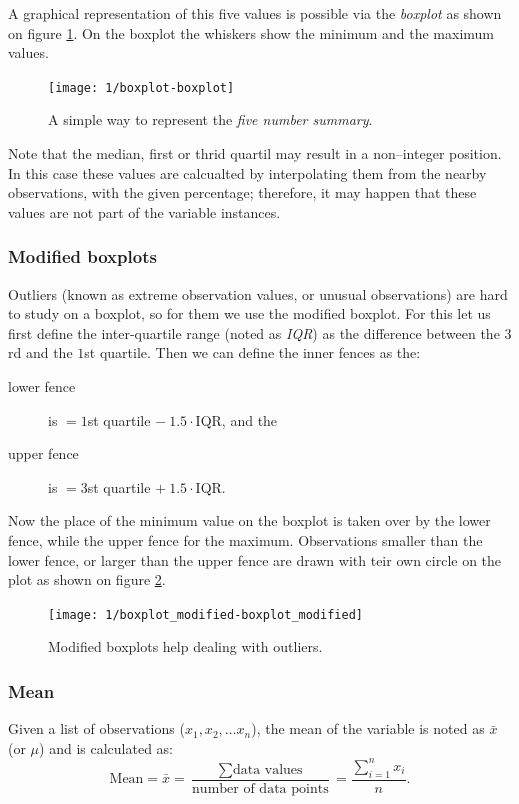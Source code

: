 A graphical representation of this five values is possible via the
\emph{boxplot} as shown on figure \ref{fig:boxplot}. On the boxplot the whiskers
show the minimum and the maximum values.

\begin{figure}[htbp]
\label{fig:boxplot}
\caption{A simple way to represent the \emph{five number summary}.}
\texttt{[image: 1/boxplot-boxplot]}
\end{figure}

Note that the median, first or thrid quartil may result in a non--integer
position. In this case these values are calcualted by interpolating them from
the nearby observations, with the given percentage; therefore, it may happen that
these values are not part of the variable instances.

\subsubsection{Modified boxplots}
Outliers (known as extreme observation values, or unusual observations) are hard
to study on a boxplot, so for them we use the modified boxplot. For this let us
first define the inter-quartile range (noted as \emph{IQR}) as the difference
between the $3$rd and the $1$st quartile. Then we can define the inner fences as the:

\begin{description}
  \item[lower fence]  is $=1$st quartile $- ~1.5\cdot $IQR, and the  
  \item[upper fence]  is $=3$st quartile $+ ~1.5\cdot $IQR.  
\end{description}

Now the place of the minimum value on the boxplot is taken over by the lower
fence, while the upper fence for the maximum. Observations smaller than the
lower fence, or larger than the upper fence are drawn with teir own circle on
the plot as shown on figure \ref{fig:boxplot_modified}.

\begin{figure}[htbp]
\label{fig:boxplot_modified}
\caption{Modified boxplots help dealing with outliers.}
\texttt{[image: 1/boxplot\_modified-boxplot\_modified]}
\end{figure}

\subsubsection{Mean}
Given a list of observations ($x_1, x_2, \ldots x_n$), the mean of the variable
is noted as $\bar{x}$ (or $\mu$) and is calculated as: 
\[ \mbox{Mean} = \bar{x} = 
\frac{\sum{\mbox{data values}}}{\mbox{number of data points}} =
\frac{\sum_{i=1}^{n}{x_i}}{n}.
\]

